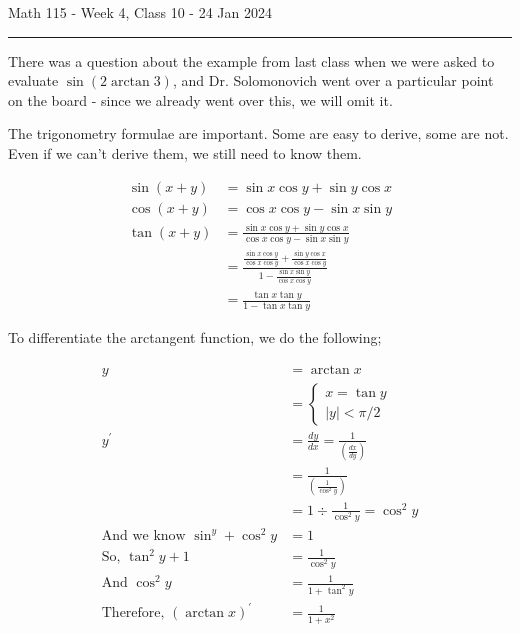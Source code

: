 \documentclass{article}
\begin{document}
Math 115 - Week 4, Class 10 - 24 Jan 2024
\hrule

\vspace{10pt}

There was a question about the example from last class when we were asked to evaluate $\sin(2\arctan3)$, and Dr. Solomonovich went over a particular point on the board - since we already went over this, we will omit it.

\vspace{10pt}

The trigonometry formulae are important. Some are easy to derive, some are not. Even if we can't derive them, we still need to know them.

\begin{align*}
\sin(x+y)&=\sin x\cos y+\sin y\cos x\\
\cos(x+y)&=\cos x\cos y-\sin x\sin y\\
\tan(x+y)&=\frac{\sin x\cos y+\sin y\cos x}{\cos x\cos y-\sin x\sin y}\\
&=\frac{\frac{\sin x\cos y}{\cos x\cos y}+\frac{\sin y\cos x}{\cos x\cos y}}{1-\frac{\sin x\sin y}{\cos x\cos y}}\\
&=\frac{\tan x\tan y}{1-\tan x\tan  y}
\end{align*}

\vspace{10pt}

To differentiate the arctangent function, we do the following;

\begin{align*}
y&=\arctan x\\
&=\left\{\begin{array}{c}x=\tan y\\|y|<\pi/2\end{array}\right.\\
y^\prime&=\frac{dy}{dx}=\frac{1}{\left(\frac{dx}{dy}\right)}\\
&=\frac{1}{\left(\frac{1}{\cos^2y}\right)}\\
&=1\div\frac{1}{\cos^2y}=\cos^2y\\
\mbox{And we know }\sin^y+\cos^2y&=1\\
\mbox{So, }\tan^2y+1&=\frac{1}{\cos^2y}\\
\mbox{And }\cos^2y&=\frac{1}{1+\tan^2y}\\
\mbox{Therefore, }(\arctan x)^\prime&=\frac{1}{1+x^2}
\end{align*}

\vspace{10pt}
\end{document}
